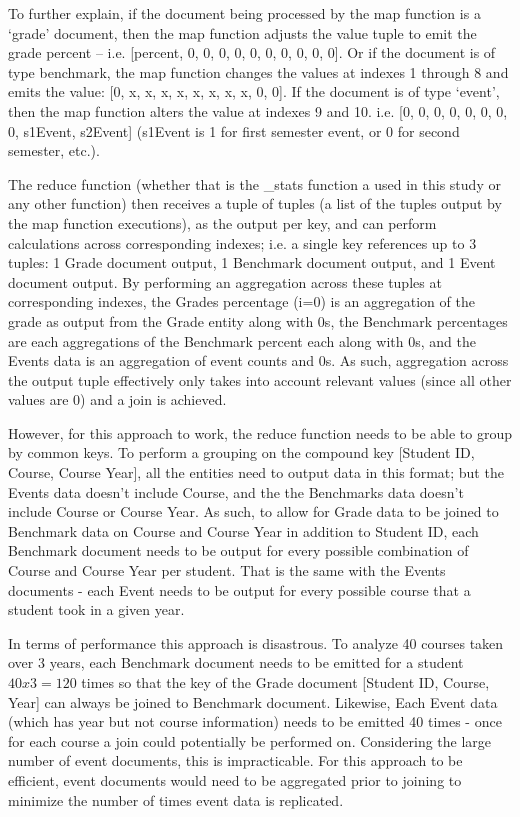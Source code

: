 To further explain, if the document being processed by the map function is a ‘grade’ document, then the map function adjusts the value tuple to emit the grade percent – i.e. [percent, 0, 0, 0, 0, 0, 0, 0, 0, 0, 0]. Or if the document is of type benchmark, the map function changes the values at indexes 1 through 8 and emits the value: [0, x, x, x, x, x, x, x, x, 0, 0]. If the document is of type ‘event’, then the map function alters the value at indexes 9 and 10. i.e. [0, 0, 0, 0, 0, 0, 0, 0, s1Event, s2Event] (s1Event is 1 for first semester event, or 0 for second semester, etc.).

The reduce function (whether that is the \_stats function a used in this study or any other function) then receives a tuple of tuples (a list of the tuples output by the map function executions), as the output per key, and can perform calculations across corresponding indexes; i.e. a single key references up to 3 tuples: 1 Grade document output, 1 Benchmark document output, and 1 Event document output. By performing an aggregation across these tuples at corresponding indexes, the Grades percentage (i=0) is an aggregation of the grade as output from the Grade entity along with 0s, the Benchmark percentages are each aggregations of the Benchmark percent each along with 0s, and the Events data is an aggregation of event counts and 0s. As such, aggregation across the output tuple effectively only takes into account relevant values (since all other values are 0) and a join is achieved.

However, for this approach to work, the reduce function needs to be able to group by common keys. To perform a grouping on the compound key [Student ID, Course, Course Year], all the entities need to output data in this format; but the Events data doesn't include Course, and the the Benchmarks data doesn't include Course or Course Year. As such, to allow for Grade data to be joined to Benchmark data on Course and Course Year in addition to Student ID, each Benchmark document needs to be output for every possible combination of Course and Course Year per student. That is the same with the Events documents - each Event needs to be output for every possible course that a student took in a given year.

In terms of performance this approach is disastrous. To analyze 40 courses taken over 3 years, each Benchmark document needs to be emitted for a student $40 x 3 = 120$ times so that the key of the Grade document [Student ID, Course, Year] can always be joined to Benchmark document. Likewise, Each Event data (which has year but not course information) needs to be emitted 40 times - once for each course a join could potentially be performed on. Considering the large number of event documents, this is impracticable. For this approach to be efficient, event documents would need to be aggregated prior to joining to minimize the number of times event data is replicated.


